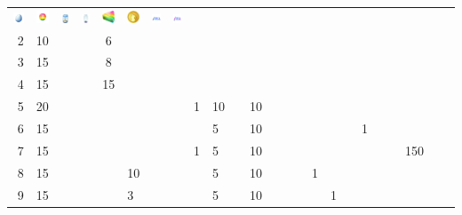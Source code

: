 \begin{table}[h!]
\begin{tabular}{r|g c g c g c g c g c g c g c g c g c g c g c g}
\includegraphics[width=1em]{images/luckyegg.png} &
\includegraphics[width=1em]{images/rarecandy.png} &
\includegraphics[width=1em]{images/incubatorlimited.png} &
\includegraphics[width=1em]{images/incubatorsuper.png} &
\includegraphics[width=1em]{images/rarecandyxl.png} &
\includegraphics[width=1em]{images/pokecoin.png} &
\includegraphics[width=1em]{images/elitefasttm.png} &
\includegraphics[width=1em]{images/elitechargedtm.png}
  \\
  2 & 10 &    &    &  6 &    &    &    &   &    &    &    &    &    &    &   &   &    &   &   &   &   &   &   \\
  3 & 15 &    &    &  8 &    &    &    &   &    &    &    &    &    &    &   &   &    &   &   &   &   &   &   \\
  4 & 15 &    &    & 15 &    &    &    &   &    &    &    &    &    &    &   &   &    &   &   &   &   &   &   \\
  5 & 20 &    &    &    &    &    &    & 1 & 10 &    & 10 &    &    &    &   &   &    &   &   &   &   &   &   \\
  6 & 15 &    &    &    &    &    &    &   &  5 &    & 10 &    &    &    &   &   &    & 1 &   &   &   &   &   \\
  7 & 15 &    &    &    &    &    &    & 1 &  5 &    & 10 &    &    &    &   &   &    &   &   &   &150&   &   \\
  8 & 15 &    &    &    & 10 &    &    &   &  5 &    & 10 &    &    &    & 1 &   &    &   &   &   &   &   &   \\
  9 & 15 &    &    &    &  3 &    &    &   &  5 &    & 10 &    &    &    &   & 1 &    &   &   &   &   &   &   \\

\end{tabular}
\end{table}
